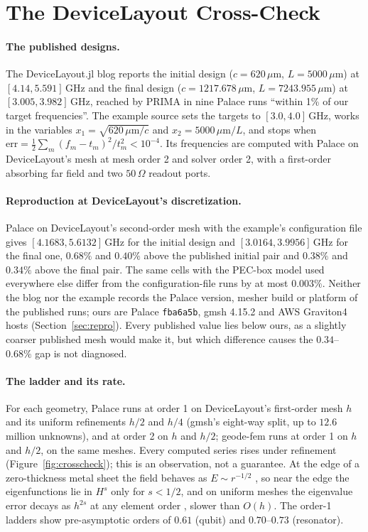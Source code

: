 \documentclass{anvil-paper}
\begin{document}
\section{The DeviceLayout Cross-Check}
\label{sec:crosscheck}

\paragraph{The published designs.}
The DeviceLayout.jl blog \citep{devicelayout-blog} reports the initial
design ($c = 620\,\mu$m, $L = 5000\,\mu$m) at $[4.14, 5.591]$\,GHz and
the final design ($c = 1217.678\,\mu$m, $L = 7243.955\,\mu$m) at
$[3.005, 3.982]$\,GHz, reached by PRIMA in nine Palace runs ``within 1\% of
our target frequencies''. The example source \citep{devicelayout-example}
sets the targets to $[3.0, 4.0]$\,GHz, works in the variables $x_1 =
\sqrt{620\,\mu\mathrm{m}/c}$ and $x_2 = 5000\,\mu\mathrm{m}/L$, and stops
when $\mathrm{err} = \frac12\sum_m (f_m - t_m)^2/t_m^2 < 10^{-4}$. Its
frequencies are computed with Palace on DeviceLayout's mesh at mesh order 2
and solver order 2, with a first-order absorbing far field and two
$50\,\Omega$ readout ports.

\paragraph{Reproduction at DeviceLayout's discretization.}
Palace on DeviceLayout's second-order mesh with the example's
configuration file gives $[4.1683, 5.6132]$\,GHz for the initial design
and $[3.0164, 3.9956]$\,GHz for the final one, $0.68\%$ and $0.40\%$
above the published initial pair and $0.38\%$ and $0.34\%$ above the
final pair. The same cells with the PEC-box model used everywhere else
differ from the configuration-file runs by at most $0.003\%$. Neither the
blog nor the example records the Palace version, mesher build or platform
of the published runs; ours are Palace \texttt{fba6a5b}, gmsh 4.15.2 and
AWS Graviton4 hosts (Section~\ref{sec:repro}). Every published value lies
below ours, as a slightly coarser published mesh would make it, but which
difference causes the $0.34$--$0.68\%$ gap is not diagnosed.

\paragraph{The ladder and its rate.}
For each geometry, Palace runs at order 1 on DeviceLayout's first-order
mesh $h$ and its uniform refinements $h/2$ and $h/4$ (gmsh's eight-way
split, up to $12.6$ million unknowns), and at order 2 on $h$ and $h/2$;
geode-fem runs at order 1 on $h$ and $h/2$, on the same meshes. Every
computed series rises under refinement (Figure~\ref{fig:crosscheck}); this
is an observation, not a guarantee. At the edge of a zero-thickness metal
sheet the field behaves as $E \sim r^{-1/2}$ \citep{meixner1972behavior},
so near the edge the eigenfunctions lie in $H^{s}$ only for $s < 1/2$, and
on uniform meshes the eigenvalue error decays as $h^{2s}$ at any element
order \citep{boffi2010finite}, slower than $O(h)$. The order-1
ladders show pre-asymptotic orders of $0.61$ (qubit) and $0.70$--$0.73$
(resonator).
\end{document}
